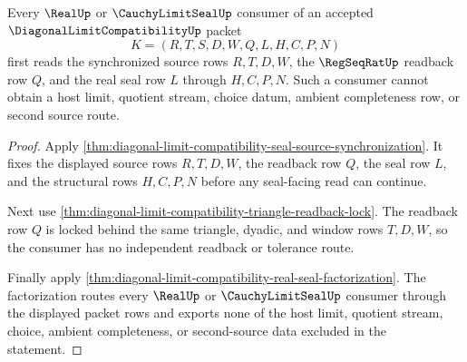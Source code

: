 \begin{theorem}
\label{thm:diagonal-limit-compatibility-real-seal-consumer-scope}
Every $\RealUp$ or $\CauchyLimitSealUp$ consumer of an accepted
$\DiagonalLimitCompatibilityUp$ packet
$$
K=(R,T,S,D,W,Q,L,H,C,P,N)
$$
first reads the synchronized source rows $R,T,D,W$, the $\RegSeqRatUp$
readback row $Q$, and the real seal row $L$ through $H,C,P,N$. Such a
consumer cannot obtain a host limit, quotient stream, choice datum, ambient
completeness row, or second source route.
\end{theorem}
\begin{proof}
Apply \autoref{thm:diagonal-limit-compatibility-seal-source-synchronization}.
It fixes the displayed source rows $R,T,D,W$, the readback row $Q$, the seal
row $L$, and the structural rows $H,C,P,N$ before any seal-facing read can
continue.

Next use \autoref{thm:diagonal-limit-compatibility-triangle-readback-lock}.
The readback row $Q$ is locked behind the same triangle, dyadic, and window
rows $T,D,W$, so the consumer has no independent readback or tolerance route.

Finally apply
\autoref{thm:diagonal-limit-compatibility-real-seal-factorization}. The
factorization routes every $\RealUp$ or $\CauchyLimitSealUp$ consumer through
the displayed packet rows and exports none of the host limit, quotient stream,
choice, ambient completeness, or second-source data excluded in the statement.
\end{proof}

